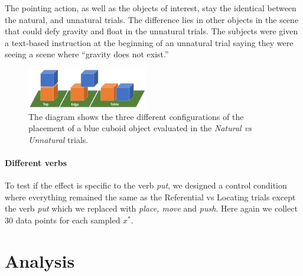 \documentclass[letterpaper]{article} %
\begin{document}
The pointing action, as well as the objects of interest, stay the identical between the natural, and unnatural trials. The difference lies in other objects in the scene that could defy gravity and float in the unnatural trials. The subjects were given a text-based instruction at the beginning of an unnatural trial saying they were seeing a scene where ``gravity does not exist.'' 


\begin{figure}[h!]
    \centering
    \includegraphics[width=0.47\textwidth] {topedgetable.png}
    \caption{
    The diagram shows the three different configurations of the placement of a blue cuboid object evaluated in the \textit{Natural vs Unnatural} trials. 
    }
    \label{fig:topedgetable}
\end{figure}


\paragraph{Different verbs}  
To test if the effect is specific to the verb \textit{put}, we designed a control condition where everything remained the same as the Referential vs Locating trials except the verb \textit{put} which we replaced with \textit{place, move} and \textit{push}. Here again we collect 30 data points for each sampled $x^*$.


\section{Analysis}
\label{analysis}
\end{document}
